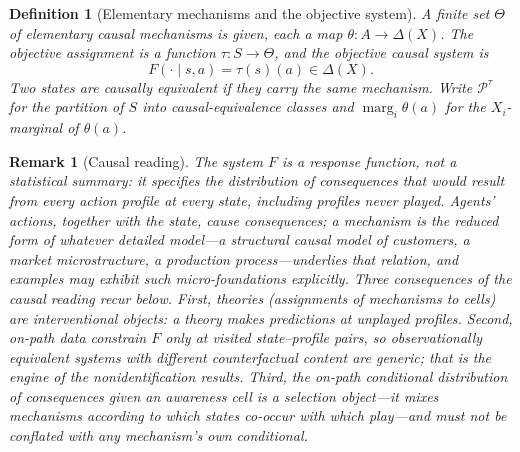 \documentclass[11pt]{article}
\newtheorem{definition}[assumption]{Definition}
\newtheorem{remark}[assumption]{Remark}
\newcommand{\marg}[1]{\operatorname{marg}_{#1}}
\begin{document}
\begin{definition}[Elementary mechanisms and the objective system]
\label{def:mechanisms}
A finite set $\Theta$ of \emph{elementary causal mechanisms} is given, each a
map $\theta:A\to\Delta(X)$.  The \emph{objective assignment} is a function
$\tau:S\to\Theta$, and the \emph{objective causal system} is
\begin{equation}
F(\cdot\mid s,a)=\tau(s)(a)\in\Delta(X).
\label{eq:objective-system}
\end{equation}
Two states are \emph{causally equivalent} if they carry the same mechanism.
Write $\mathcal P^{\tau}$ for the partition of $S$ into causal-equivalence
classes and $\marg{i}\theta(a)$ for the $X_i$-marginal of $\theta(a)$.
\end{definition}

\begin{remark}[Causal reading]
\label{rem:causal-reading}
The system $F$ is a response function, not a statistical summary: it specifies
the distribution of consequences that would result from \emph{every} action
profile at every state, including profiles never played.  Agents' actions,
together with the state, cause consequences; a mechanism is the reduced form
of whatever detailed model---a structural causal model of customers, a market
microstructure, a production process---underlies that relation, and examples
may exhibit such micro-foundations explicitly.  Three consequences of the
causal reading recur below.  First, theories (assignments of mechanisms to
cells) are interventional objects: a theory makes predictions at unplayed
profiles.  Second, on-path data constrain $F$ only at visited state--profile
pairs, so observationally equivalent systems with different counterfactual
content are generic; that is the engine of the nonidentification results.
Third, the on-path conditional distribution of consequences given an
awareness cell is a \emph{selection object}---it mixes mechanisms according to
which states co-occur with which play---and must not be conflated with any
mechanism's own conditional.
\end{remark}
\end{document}
